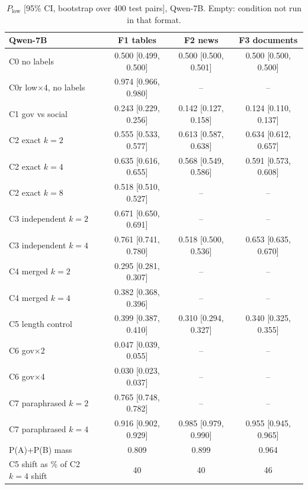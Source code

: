 \begin{table}[!htbp]\centering\scriptsize\setlength{\tabcolsep}{4pt}\begin{tabular}{@{}lccc@{}}\toprule
Qwen-7B & F1 tables & F2 news & F3 documents \\ \midrule
C0 no labels & 0.500 [0.499, 0.500] & 0.500 [0.500, 0.501] & 0.500 [0.500, 0.500] \\
C0r low$\times$4, no labels & 0.974 [0.966, 0.980] & -- & -- \\
C1 gov vs social & 0.243 [0.229, 0.256] & 0.142 [0.127, 0.158] & 0.124 [0.110, 0.137] \\
C2 exact $k{=}2$ & 0.555 [0.533, 0.577] & 0.613 [0.587, 0.638] & 0.634 [0.612, 0.657] \\
C2 exact $k{=}4$ & 0.635 [0.616, 0.655] & 0.568 [0.549, 0.586] & 0.591 [0.573, 0.608] \\
C2 exact $k{=}8$ & 0.518 [0.510, 0.527] & -- & -- \\
C3 independent $k{=}2$ & 0.671 [0.650, 0.691] & -- & -- \\
C3 independent $k{=}4$ & 0.761 [0.741, 0.780] & 0.518 [0.500, 0.536] & 0.653 [0.635, 0.670] \\
C4 merged $k{=}2$ & 0.295 [0.281, 0.307] & -- & -- \\
C4 merged $k{=}4$ & 0.382 [0.368, 0.396] & -- & -- \\
C5 length control & 0.399 [0.387, 0.410] & 0.310 [0.294, 0.327] & 0.340 [0.325, 0.355] \\
C6 gov$\times$2 & 0.047 [0.039, 0.055] & -- & -- \\
C6 gov$\times$4 & 0.030 [0.023, 0.037] & -- & -- \\
C7 paraphrased $k{=}2$ & 0.765 [0.748, 0.782] & -- & -- \\
C7 paraphrased $k{=}4$ & 0.916 [0.902, 0.929] & 0.985 [0.979, 0.990] & 0.955 [0.945, 0.965] \\
\midrule P(A)+P(B) mass & 0.809 & 0.899 & 0.964 \\
C5 shift as \% of C2 $k{=}4$ shift & 40 & 40 & 46 \\
\bottomrule\end{tabular}\caption{$P_{\text{low}}$ [95\% CI, bootstrap over 400 test pairs], Qwen-7B. Empty: condition not run in that format.}\end{table}
